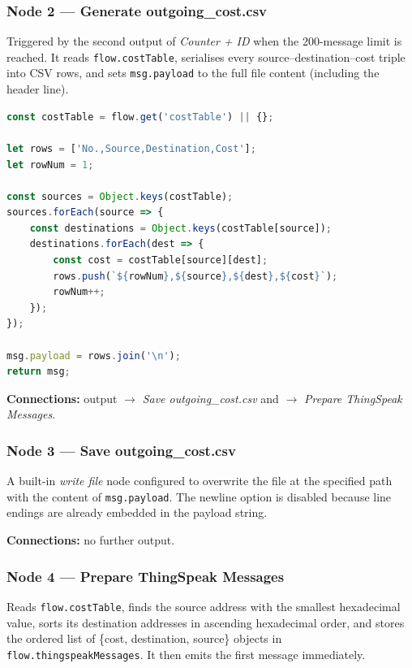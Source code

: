 \documentclass[a4paper,11pt]{article}
\begin{document}
\subsubsection*{Node 2 — Generate outgoing\_cost.csv}

Triggered by the second output of \textit{Counter + ID} when the 200-message limit is reached. It reads \texttt{flow.costTable}, serialises every source--destination--cost triple into CSV rows, and sets \texttt{msg.payload} to the full file content (including the header line).

\begin{lstlisting}[language=JavaScript, caption={Generate outgoing\_cost.csv}]
const costTable = flow.get('costTable') || {};

let rows = ['No.,Source,Destination,Cost'];
let rowNum = 1;

const sources = Object.keys(costTable);
sources.forEach(source => {
    const destinations = Object.keys(costTable[source]);
    destinations.forEach(dest => {
        const cost = costTable[source][dest];
        rows.push(`${rowNum},${source},${dest},${cost}`);
        rowNum++;
    });
});

msg.payload = rows.join('\n');
return msg;
\end{lstlisting}

\textbf{Connections:} output $\to$ \textit{Save outgoing\_cost.csv} and $\to$ \textit{Prepare ThingSpeak Messages}.

\subsubsection*{Node 3 — Save outgoing\_cost.csv}

A built-in \textit{write file} node configured to overwrite the file at the specified path with the content of \texttt{msg.payload}. The newline option is disabled because line endings are already embedded in the payload string.

\textbf{Connections:} no further output.

\subsubsection*{Node 4 — Prepare ThingSpeak Messages}

Reads \texttt{flow.costTable}, finds the source address with the smallest hexadecimal value, sorts its destination addresses in ascending hexadecimal order, and stores the ordered list of \{cost, destination, source\} objects in \texttt{flow.thingspeakMessages}. It then emits the first message immediately.
\end{document}
